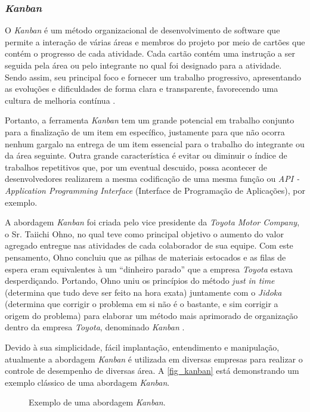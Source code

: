 \subsubsection{\textit{Kanban}}

O \textit{Kanban} é um método organizacional de desenvolvimento de software que permite a interação de várias áreas e membros do projeto por meio de cartões que contém o progresso de cada atividade. Cada cartão contém uma instrução a ser seguida pela área ou pelo integrante no qual foi designado para a atividade. Sendo assim, seu principal foco e fornecer um trabalho progressivo, apresentando as evoluções e dificuldades de forma clara e transparente, favorecendo uma cultura de melhoria contínua \cite{KANBAN2014}.

Portanto, a ferramenta \textit{Kanban} tem um grande potencial em trabalho conjunto para a finalização de um item em específico, justamente para que não ocorra nenhum gargalo na entrega de um item essencial para o trabalho do integrante ou da área seguinte. Outra grande característica é evitar ou diminuir o índice de trabalhos repetitivos que, por um eventual descuido, possa acontecer de desenvolvedores realizarem a mesma codificação de uma mesma função ou \textit{API - Application Programming Interface} (Interface de Programação de Aplicações), por exemplo.

A abordagem \textit{Kanban} foi criada pelo vice presidente da \textit{Toyota Motor Company}, o Sr. Taiichi Ohno, no qual teve como principal objetivo o aumento do valor agregado entregue nas atividades de cada colaborador de sua equipe. Com este pensamento,  Ohno concluiu que as pilhas de materiais estocados e as filas de espera eram equivalentes à um “dinheiro parado” que a empresa \textit{Toyota} estava desperdiçando. Portando,   Ohno uniu os princípios do método \textit{just in time} (determina que tudo deve ser feito na hora exata)  juntamente com o \textit{Jidoka} (determina que corrigir o problema em si não é o bastante, e sim corrigir a origem do problema) para elaborar um método mais aprimorado de organização dentro da empresa \textit{Toyota}, denominado \textit{Kanban} \cite{TOYOTA1977}.

Devido à sua simplicidade, fácil implantação, entendimento e manipulação, atualmente a abordagem \textit{Kanban} é utilizada em diversas empresas para realizar o controle de desempenho de diversas área. A \autoref{fig_kanban} está demonstrando um exemplo clássico de uma abordagem \textit{Kanban}.

\begin{figure}[h]
	\caption{\label{fig_kanban}Exemplo de uma abordagem \textit{Kanban}.}
	\begin{center}
	\end{center}
	\centering {}
\end{figure}